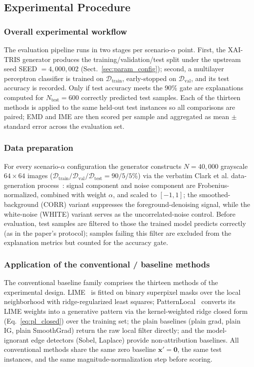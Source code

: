 \documentclass[pdflatex,sn-mathphys-num]{sn-jnl}
\theoremstyle{thmstyleone}
\theoremstyle{thmstyletwo}%
\theoremstyle{thmstylethree}%
\begin{document}
\subsection{Experimental Procedure}

\subsubsection{Overall experimental workflow}
The evaluation pipeline runs in two stages per scenario-$\alpha$ point. First, the XAI-TRIS generator produces the training/validation/test split under the upstream seed SEED $=4{,}000{,}002$ (Sect.~\ref{sec:param_config}); second, a multilayer perceptron classifier is trained on $\mathcal{D}_{\text{train}}$, early-stopped on $\mathcal{D}_{\text{val}}$, and its test accuracy is recorded. Only if test accuracy meets the 90\% gate are explanations computed for $N_{\text{test}}=600$ correctly predicted test samples. Each of the thirteen methods is applied to the same held-out test instances so all comparisons are paired; EMD and IME are then scored per sample and aggregated as mean $\pm$ standard error across the evaluation set.

\subsubsection{Data preparation}
For every scenario-$\alpha$ configuration the generator constructs $N=40{,}000$ grayscale $64\times64$ images ($\mathcal{D}_{\text{train}}/\mathcal{D}_{\text{val}}/\mathcal{D}_{\text{test}} = 90/5/5\%$) via the verbatim Clark et al. data-generation process~\cite{clark2024}: signal component and noise component are Frobenius-normalized, combined with weight $\alpha$, and scaled to $[-1,1]$; the smoothed-background (CORR) variant suppresses the foreground-denoising signal, while the white-noise (WHITE) variant serves as the uncorrelated-noise control. Before evaluation, test samples are filtered to those the trained model predicts correctly (as in the paper's protocol); samples failing this filter are excluded from the explanation metrics but counted for the accuracy gate.

\subsubsection{Application of the conventional / baseline methods}
The conventional baseline family comprises the thirteen methods of the experimental design. LIME~\cite{ribeiro2016} is fitted on binary superpixel masks over the local neighborhood with ridge-regularized least squares; PatternLocal~\cite{patternlocal_citation} converts its LIME weights into a generative pattern via the kernel-weighted ridge closed form (Eq.~\eqref{eq:pl_closed}) over the training set; the plain baselines (plain grad, plain IG, plain SmoothGrad) return the raw local filter directly; and the model-ignorant edge detectors (Sobel, Laplace) provide non-attribution baselines. All conventional methods share the same zero baseline $\mathbf{x}'=\mathbf{0}$, the same test instances, and the same magnitude-normalization step before scoring.
\end{document}
